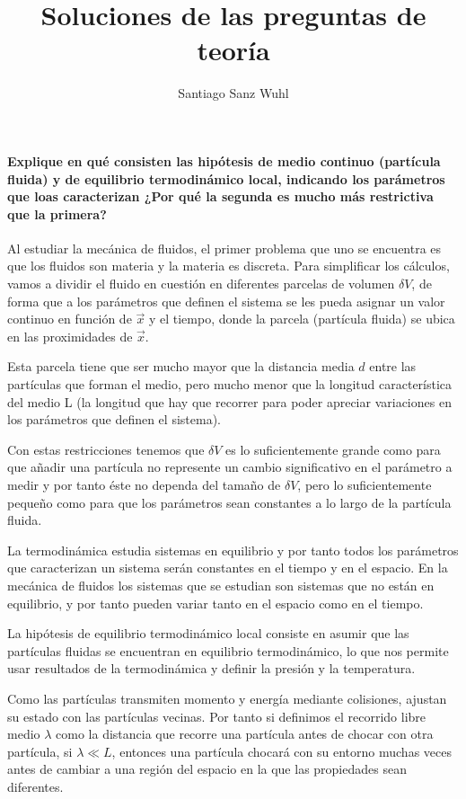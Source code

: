 \documentclass[a4paper]{article}
\title{Soluciones de las preguntas de teoría}
\author{Santiago Sanz Wuhl}
\begin{document}
\maketitle

\paragraph{Explique en qué consisten las hipótesis de medio continuo
(partícula fluida) y de equilibrio termodinámico local, indicando
los parámetros que loas caracterizan ¿Por qué la segunda es mucho
más restrictiva que la primera?} 

Al estudiar la mecánica de fluidos, el primer problema que uno se 
encuentra es que los fluidos son materia y la materia es discreta.
Para simplificar los cálculos, vamos a dividir el fluido en cuestión
en diferentes parcelas de volumen $\delta V$, de forma que 
a los parámetros que definen el sistema se les pueda asignar un valor
continuo en función de $\vec{x}$ y el tiempo, donde la parcela 
(partícula fluida) se ubica en las proximidades de $\vec{x}$. 

Esta parcela tiene que ser mucho mayor que la distancia media $d$ entre
las partículas que forman el medio, pero mucho menor que la longitud
característica del medio L (la longitud que hay que recorrer para 
poder apreciar variaciones en los parámetros que definen el sistema).

Con estas restricciones tenemos que $\delta V$ es lo suficientemente
grande como para que añadir una partícula no represente un cambio 
significativo en el parámetro a medir y por tanto éste no dependa
del tamaño de $\delta V$, pero lo suficientemente pequeño como para
que los parámetros sean constantes a lo largo de la partícula fluida.

La termodinámica estudia sistemas en equilibrio y por tanto todos los
parámetros que caracterizan un sistema serán constantes en el tiempo y
en el espacio. En la mecánica de fluidos los sistemas que se estudian 
son sistemas que no están en equilibrio, y por tanto pueden variar
tanto en el espacio como en el tiempo.

La hipótesis de equilibrio termodinámico local consiste en asumir que 
las partículas fluidas se encuentran en equilibrio termodinámico, lo
que nos permite usar resultados de la termodinámica y definir la 
presión y la temperatura.

Como las partículas transmiten momento y energía mediante colisiones,
ajustan su estado con las partículas vecinas. Por tanto si definimos
el recorrido libre medio $\lambda$ como la distancia que recorre una partícula
antes de chocar con otra partícula, si $\lambda \ll L$, entonces una
partícula chocará con su entorno muchas veces antes de cambiar a 
una región del espacio en la que las propiedades sean diferentes. 
\end{document}
